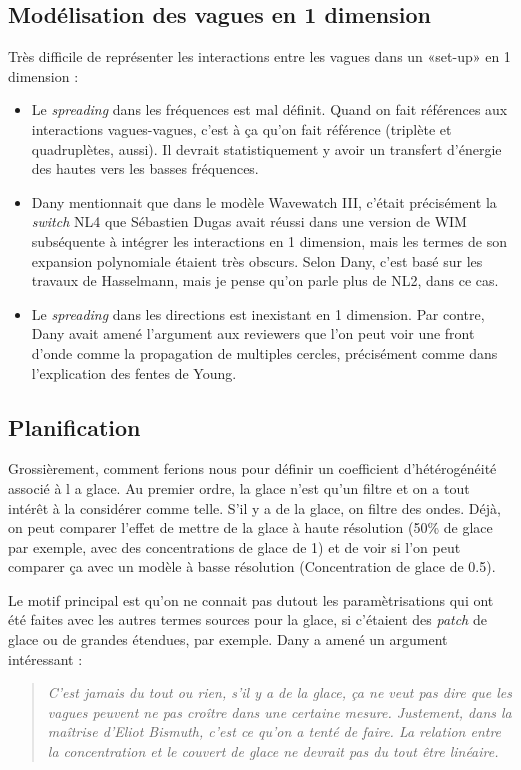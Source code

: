 \documentclass[10pt]{article}
\numberwithin{equation}{section}
\begin{document}
\subsection{Modélisation des vagues en 1 dimension}
\label{sec:org0a0dfe4}
Très difficile de représenter les interactions  entre les vagues dans un «set-up» en 1 dimension : 
\begin{itemize}
\item Le \emph{spreading} dans les fréquences est mal définit.
Quand on fait références aux interactions vagues-vagues, c'est à ça qu'on fait référence (triplète et quadruplètes, aussi).
Il devrait statistiquement y avoir un transfert d'énergie des hautes vers les basses fréquences.
\item Dany mentionnait que dans le modèle Wavewatch III, c'était précisément la \emph{switch} NL4 que Sébastien Dugas avait réussi dans une version de WIM subséquente à intégrer les interactions en 1 dimension, mais les termes de son expansion polynomiale étaient très obscurs.
Selon Dany, c'est basé sur les travaux de Hasselmann, mais je pense qu'on parle plus de NL2, dans ce cas.
\item Le \emph{spreading} dans les directions est inexistant en 1 dimension.
Par contre, Dany avait amené l'argument aux reviewers que l'on peut voir une front d'onde comme la propagation de multiples cercles, précisément comme dans l'explication des fentes de Young.
\end{itemize}
\subsection{Planification}
\label{sec:org8cc02ab}
Grossièrement, comment ferions nous pour définir un coefficient d'hétérogénéité associé à l a glace.
Au premier ordre, la glace n'est qu'un filtre et on a tout intérêt à la considérer comme telle.
S'il y a de la glace, on filtre des ondes.
Déjà, on peut comparer l'effet de mettre de la glace à haute résolution (50\% de glace par exemple, avec des concentrations de glace de 1) et de voir si l'on peut comparer ça avec un modèle à basse résolution (Concentration de glace de 0.5). \bigskip

Le motif principal est qu'on ne connait pas dutout les paramètrisations qui ont été faites avec les autres termes sources pour la glace, si c'étaient des \emph{patch} de glace ou de grandes étendues, par exemple.
Dany a amené un argument intéressant :\smallskip
\begin{quote}
\emph{C'est jamais du tout ou rien, s'il y a de la glace, ça ne veut pas dire que les vagues peuvent ne pas croître dans une certaine mesure. Justement, dans la maîtrise d'Eliot Bismuth, c'est ce qu'on a tenté de faire. La relation entre la concentration et le couvert de glace ne devrait pas du tout être linéaire.}
\end{quote}
\end{document}
